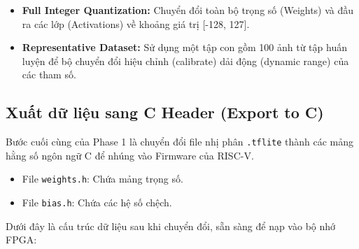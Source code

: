 \begin{itemize}
    \item \textbf{Full Integer Quantization:} Chuyển đổi toàn bộ trọng số (Weights) và đầu ra các lớp (Activations) về khoảng giá trị [-128, 127].
    \item \textbf{Representative Dataset:} Sử dụng một tập con gồm 100 ảnh từ tập huấn luyện để bộ chuyển đổi hiệu chỉnh (calibrate) dải động (dynamic range) của các tham số.
\end{itemize}




\subsection{Xuất dữ liệu sang C Header (Export to C)}
Bước cuối cùng của Phase 1 là chuyển đổi file nhị phân \texttt{.tflite} 
thành các mảng hằng số ngôn ngữ C để nhúng vào Firmware của RISC-V. 
\begin{itemize}
    \item File \texttt{weights.h}: Chứa mảng trọng số.
    \item File \texttt{bias.h}: Chứa các hệ số chệch.
\end{itemize}

Dưới đây là cấu trúc dữ liệu sau khi chuyển đổi, sẵn sàng để nạp vào bộ nhớ FPGA:



